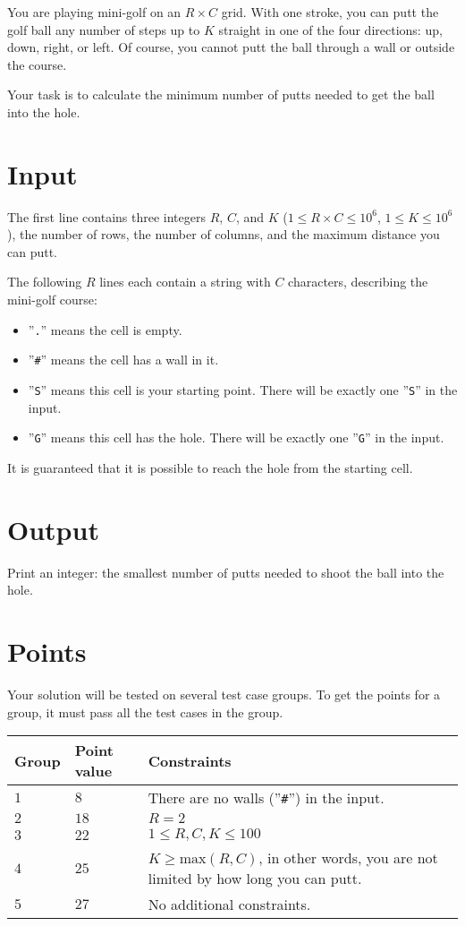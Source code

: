 
You are playing mini-golf on an $R \times C$ grid.
With one stroke, you can putt the golf ball any number of steps up to $K$ straight in one of the four directions:
up, down, right, or left. Of course, you cannot putt the ball through a wall or outside the course.

Your task is to calculate the minimum number of putts needed to get the ball into the hole.


\section*{Input}
The first line contains three integers $R$, $C$, and $K$ ($1 \leq R \times C \leq 10^6$, $1 \leq K \leq 10^6$), the number of rows,
the number of columns, and the maximum distance you can putt.

The following $R$ lines each contain a string with $C$ characters, describing the mini-golf course:
\begin{itemize}
  \item ”\verb!.!” means the cell is empty.
  \item ”\verb!#!” means the cell has a wall in it.
  \item ”\verb!S!” means this cell is your starting point. There will be exactly one ”\verb!S!” in the input.
  \item ”\verb!G!” means this cell has the hole. There will be exactly one ”\verb!G!” in the input.
\end{itemize}

It is guaranteed that it is possible to reach the hole from the starting cell.

\section*{Output}
Print an integer: the smallest number of putts needed to shoot the ball into the hole.

\section*{Points}
Your solution will be tested on several test case groups.
To get the points for a group, it must pass all the test cases in the group.

\noindent
\begin{tabular}{| l | l | p{12cm} |}
  \hline
  \textbf{Group} & \textbf{Point value} & \textbf{Constraints} \\ \hline
  $1$   & $8$        & There are no walls (”\verb!#!”) in the input. \\ \hline
  $2$   & $18$       & $R = 2$ \\ \hline
  $3$   & $22$       & $1\le R,C,K\le 100$ \\ \hline
  $4$   & $25$       & $K \ge \text{max}(R,C)$, in other words, you are not limited by how long you can putt. \\ \hline
  $5$   & $27$       & No additional constraints. \\ \hline
\end{tabular}

